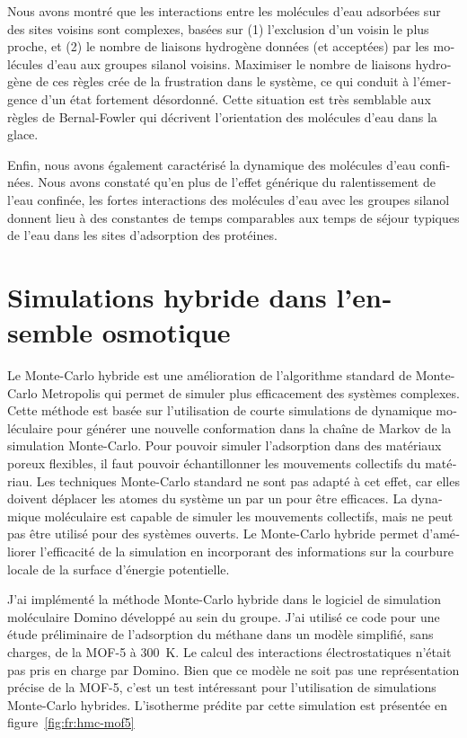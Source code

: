 \documentclass[thesis]{subfiles}
\begin{document}
\begin{otherlanguage}{french}
Nous avons montré que les interactions entre les molécules d'eau adsorbées sur
des sites voisins sont complexes, basées sur (1) l'exclusion d'un voisin le plus
proche, et (2) le nombre de liaisons hydrogène données (et acceptées) par les
molécules d'eau aux groupes silanol voisins. Maximiser le nombre de liaisons
hydrogène de ces règles crée de la frustration dans le système, ce qui conduit à
l'émergence d'un état fortement désordonné. Cette situation est très semblable
aux règles de Bernal-Fowler qui décrivent l'orientation des molécules d'eau dans
la glace\cite{Bernal1933}.

Enfin, nous avons également caractérisé la dynamique des molécules d'eau
confinées. Nous avons constaté qu'en plus de l'effet générique du ralentissement
de l'eau confinée, les fortes interactions des molécules d'eau avec les groupes
silanol donnent lieu à des constantes de temps comparables aux temps de séjour
typiques de l'eau dans les sites d'adsorption des protéines.

\clearpage
\section{Simulations hybride dans l'ensemble osmotique}

Le Monte-Carlo hybride est une amélioration de l'algorithme standard de
Monte-Carlo Metropolis qui permet de simuler plus efficacement des systèmes
complexes. Cette méthode est basée sur l'utilisation de courte simulations de
dynamique moléculaire pour générer une nouvelle conformation dans la chaîne de
Markov de la simulation Monte-Carlo. Pour pouvoir simuler l'adsorption dans des
matériaux poreux flexibles, il faut pouvoir échantillonner les mouvements
collectifs du matériau. Les techniques Monte-Carlo standard ne sont pas adapté à
cet effet, car elles doivent déplacer les atomes du système un par un pour être
efficaces. La dynamique moléculaire est capable de simuler les mouvements
collectifs, mais ne peut pas être utilisé pour des systèmes ouverts. Le
Monte-Carlo hybride permet d'améliorer l'efficacité de la simulation en
incorporant des informations sur la courbure locale de la surface d'énergie
potentielle.

J'ai implémenté la méthode Monte-Carlo hybride dans le logiciel de simulation
moléculaire Domino développé au sein du groupe. J'ai utilisé ce code pour une
étude préliminaire de l'adsorption du méthane  dans un modèle
simplifié, sans charges, de la MOF-5 à \SI{300}{K}. Le calcul des interactions
électrostatiques n'était pas pris en charge par Domino. Bien que ce modèle ne
soit pas une représentation précise de la MOF-5, c'est un test intéressant pour
l'utilisation de simulations Monte-Carlo hybrides. L'isotherme prédite par cette
simulation est présentée en figure~\ref{fig:fr:hmc-mof5}


\end{otherlanguage}
\end{document}
